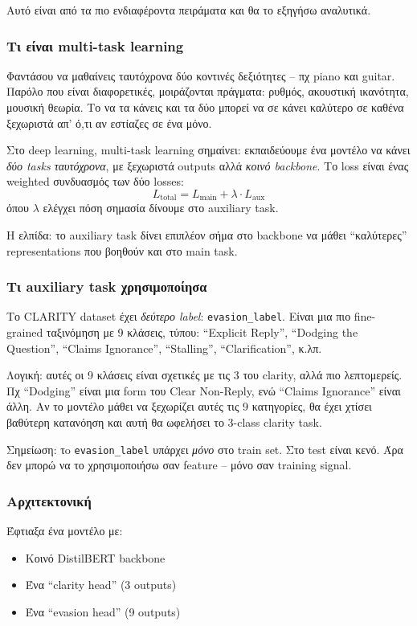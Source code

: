\documentclass[12pt]{fphw}
\begin{document}
Αυτό είναι από τα πιο ενδιαφέροντα πειράματα και θα το εξηγήσω αναλυτικά.

\subsubsection{Τι είναι multi-task learning}

Φαντάσου να μαθαίνεις ταυτόχρονα δύο κοντινές δεξιότητες -- πχ piano και guitar. Παρόλο που είναι διαφορετικές, μοιράζονται πράγματα: ρυθμός, ακουστική ικανότητα, μουσική θεωρία. Το να τα κάνεις και τα δύο μπορεί να σε κάνει καλύτερο σε καθένα ξεχωριστά απ' ό,τι αν εστίαζες σε ένα μόνο.

Στο deep learning, multi-task learning σημαίνει: εκπαιδεύουμε ένα μοντέλο να κάνει \emph{δύο tasks ταυτόχρονα}, με ξεχωριστά outputs αλλά \emph{κοινό backbone}. Το loss είναι ένας weighted συνδυασμός των δύο losses:
\[
L_{\text{total}} = L_{\text{main}} + \lambda \cdot L_{\text{aux}}
\]
όπου $\lambda$ ελέγχει πόση σημασία δίνουμε στο auxiliary task.

Η ελπίδα: το auxiliary task δίνει επιπλέον σήμα στο backbone να μάθει ``καλύτερες'' representations που βοηθούν και στο main task.

\subsubsection{Τι auxiliary task χρησιμοποίησα}

Το CLARITY dataset έχει \emph{δεύτερο label}: \texttt{evasion\_label}. Είναι μια πιο fine-grained ταξινόμηση με 9 κλάσεις, τύπου: ``Explicit Reply'', ``Dodging the Question'', ``Claims Ignorance'', ``Stalling'', ``Clarification'', κ.λπ.

Λογική: αυτές οι 9 κλάσεις είναι σχετικές με τις 3 του clarity, αλλά πιο λεπτομερείς. Πχ ``Dodging'' είναι μια form του Clear Non-Reply, ενώ ``Claims Ignorance'' είναι άλλη. Αν το μοντέλο μάθει να ξεχωρίζει αυτές τις 9 κατηγορίες, θα έχει χτίσει βαθύτερη κατανόηση και αυτή θα ωφελήσει το 3-class clarity task.

Σημείωση: τo \texttt{evasion\_label} υπάρχει \emph{μόνο} στο train set. Στο test είναι κενό. Άρα δεν μπορώ να το χρησιμοποιήσω σαν feature -- μόνο σαν training signal.

\subsubsection{Αρχιτεκτονική}

Έφτιαξα ένα μοντέλο με:
\begin{itemize}
    \item Κοινό DistilBERT backbone
    \item Ένα ``clarity head'' (3 outputs)
    \item Ένα ``evasion head'' (9 outputs)
\end{itemize}
\end{document}
